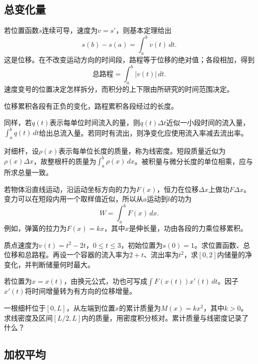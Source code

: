\subsection{总变化量}

若位置函数\(s\)连续可导，速度为\(v=s'\)，则基本定理给出
\begin{equation*}
 s(b)-s(a)=\int_a^b v(t)\,dt.
\end{equation*}
这是位移。在不改变运动方向的时间段，路程等于位移的绝对值；各段相加，得到
\begin{equation*}
 \text{总路程}=\int_a^b|v(t)|\,dt.
\end{equation*}
速度变号的位置决定怎样拆分，而积分的上下限由所研究的时间范围决定。

位移累积各段有正负的变化，路程累积各段经过的长度。

同样，若\(q(t)\)表示每单位时间流入的量，则\(q(t)\Delta t\)近似一小段时间的流入量，\(\int_a^bq(t)\,dt\)给出总流入量。若同时有流出，则净变化应使用流入率减去流出率。

对细杆，设\(\rho(x)\)表示每单位长度的质量，称为线密度。短段质量近似为\(\rho(x)\Delta x\)，故整根杆的质量为\(\int_a^b\rho(x)\,dx\)。被积量与微分长度的单位相乘，应与所求总量一致。

若物体沿直线运动，沿运动坐标方向的力为\(F(x)\)，恒力在位移\(\Delta x\)上做功\(F\Delta x\)。变力可以在短段内用一个取样值近似，所以从\(a\)运动到\(b\)的功为
\begin{equation*}
 W=\int_a^bF(x)\,dx.
\end{equation*}
例如，弹簧的拉力为\(F(x)=kx\)，其中\(x\)是伸长量，功由各段的力乘位移累积。

\begin{example}
质点速度为\(v(t)=t^2-2t\)，\(0\le t\le3\)，初始位置为\(s(0)=1\)。求位置函数、总位移和总路程。再设一个容器的流入率为\(2+t\)、流出率为\(t^2\)，求\([0,2]\)内储量的净变化，并判断储量何时最大。
\end{example}

若位置为\(x=x(t)\)，由换元公式，功也可写成\(\int F(x(t))x'(t)\,dt\)。因子\(x'(t)\)将时间增量转为有方向的位移增量。

\begin{example}
一根细杆位于\([0,L]\)，从左端到位置\(x\)的累计质量为\(M(x)=kx^2\)，其中\(k>0\)。求线密度及区间\([L/2,L]\)内的质量，用密度积分核对。累计质量与线密度记录了什么？
\end{example}

\subsection{加权平均}

